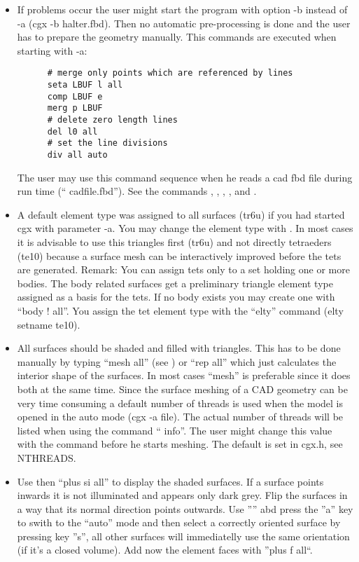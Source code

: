 \documentclass{article}
\begin{document}
\begin{appendix}
\begin{itemize}
\item If problems occur the user might start the program with option -b instead of -a (cgx -b halter.fbd). Then no automatic pre-processing is done and the user has to prepare the geometry manually. This commands are executed when starting with -a:
\begin{verbatim}
      # merge only points which are referenced by lines
      seta LBUF l all
      comp LBUF e
      merg p LBUF
      # delete zero length lines
      del l0 all
      # set the line divisions
      div all auto
\end{verbatim}
The user may use this command sequence when he reads a cad fbd file during run time (`` cadfile.fbd''). See the commands , , , ,  and .

\item A default element type was assigned to all surfaces (tr6u) if you had started cgx with parameter -a. You may change the element type with . In most cases it is advisable to use this triangles first (tr6u) and not directly tetraeders (te10) because a surface mesh can be interactively improved before the tets are generated. Remark: You can assign tets only to a set holding one or more bodies. The body related surfaces get a preliminary triangle element type assigned as a basis for the tets. If no body exists you may create one with ``body ! all''. You assign the tet element type with the ``elty'' command (elty setname te10).

\item All surfaces should be shaded and filled with triangles. This has to be done manually by typing ``mesh all'' (see ) or ``rep all'' which just calculates the interior shape of the surfaces. In most cases ``mesh'' is preferable since it does both at the same time. Since the surface meshing of a CAD geometry can be very time consuming a default number of threads is used when the model is opened in the auto mode (cgx -a file). The actual number of threads will be listed when using the command `` info''. The user might change this value with the command  before he starts meshing. The default is set in cgx.h, see NTHREADS.

\item Use then ``plus si all'' to display the shaded surfaces. If a surface points inwards it is not illuminated and appears only dark grey. Flip the surfaces in a way that its normal direction points outwards. Use '''' abd press the ''a'' key to swith to the ``auto'' mode and then select a correctly oriented surface by pressing key ''s'', all other surfaces will immediatelly use the same orientation (if it's a closed volume). Add now the element faces with ''plus f all``.


\end{itemize}
\end{appendix}
\end{document}
